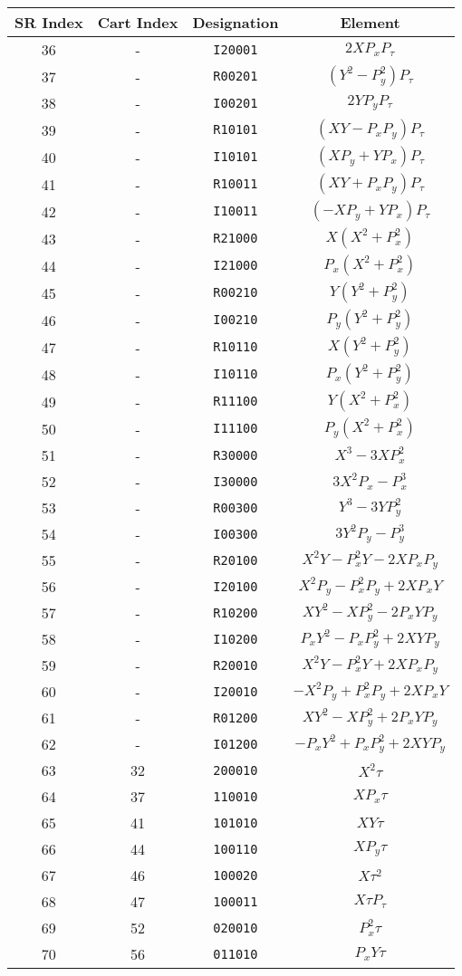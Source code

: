 {{\begin{center}
\newpage
\begin{tabular}{cccc}
SR Index&Cart Index&Designation&Element\\ \hline
   36&-&{\tt I20001}&$2XP_xP_{\tau}$\\
   37&-&{\tt R00201}&$(Y^2-P_y^2)P_{\tau}$\\
   38&-&{\tt I00201}&$2YP_yP_{\tau}$\\
   39&-&{\tt R10101}&$(XY-P_xP_y)P_{\tau}$\\
   40&-&{\tt I10101}&$(XP_y+YP_x)P_{\tau}$\\
   41&-&{\tt R10011}&$(XY+P_xP_y)P_{\tau}$\\
   42&-&{\tt I10011}&$(-XP_y+YP_x)P_{\tau}$\\
   43&-&{\tt R21000}&$X(X^2+P_x^2)$\\
   44&-&{\tt I21000}&$P_x(X^2+P_x^2)$\\
   45&-&{\tt R00210}&$Y(Y^2+P_y^2)$\\
   46&-&{\tt I00210}&$P_y(Y^2+P_y^2)$\\
   47&-&{\tt R10110}&$X(Y^2+P_y^2)$\\
   48&-&{\tt I10110}&$P_x(Y^2+P_y^2)$\\
   49&-&{\tt R11100}&$Y(X^2+P_x^2)$\\
   50&-&{\tt I11100}&$P_y(X^2+P_x^2)$\\
   51&-&{\tt R30000}&$X^3-3XP_x^2$\\
   52&-&{\tt I30000}&$3X^2P_x-P_x^3$\\
   53&-&{\tt R00300}&$Y^3-3YP_y^2$\\
   54&-&{\tt I00300}&$3Y^2P_y-P_y^3$\\
   55&-&{\tt R20100}&$X^2Y-P_x^2Y-2XP_xP_y$\\
   56&-&{\tt I20100}&$X^2P_y-P_x^2P_y+2XP_xY$\\
   57&-&{\tt R10200}&$XY^2-XP_y^2-2P_xYP_y$\\
   58&-&{\tt I10200}&$P_xY^2-P_xP_y^2+2XYP_y$\\
   59&-&{\tt R20010}&$X^2Y-P_x^2Y+2XP_xP_y$\\
   60&-&{\tt I20010}&$-X^2P_y+P_x^2P_y+2XP_xY$\\
   61&-&{\tt R01200}&$XY^2-XP_y^2+2P_xYP_y$\\
   62&-&{\tt I01200}&$-P_xY^2+P_xP_y^2+2XYP_y$\\
   63&32&{\tt 200010}&$X^2{\tau}$\\
   64&37&{\tt 110010}&$XP_x{\tau}$\\
   65&41&{\tt 101010}&$XY{\tau}$\\
   66&44&{\tt 100110}&$XP_y{\tau}$\\
   67&46&{\tt 100020}&$X{\tau}^2$\\
   68&47&{\tt 100011}&$X{\tau}P_{\tau}$\\
   69&52&{\tt 020010}&$P_x^2{\tau}$\\
   70&56&{\tt 011010}&$P_xY{\tau}$\\
\end{tabular}



\end{center}}}

